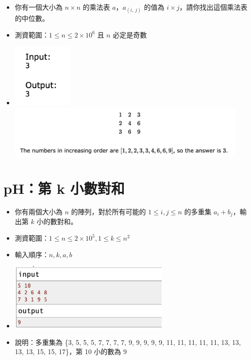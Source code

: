 \documentclass[12pt]{article}
\begin{document}
\begin{itemize}[label={}, itemsep=0pt]
    \item 你有一個大小為 $n \times n$ 的乘法表 $a$，$a_{(i,\ j)}$ 的值為 $i \times j$，請你找出這個乘法表的中位數。
    \item 測資範圍：$1 \leq n \leq 2 \times 10^6$ 且 $n$ 必定是奇數
    \item \includegraphics[width=3.0cm]{img/pG-2.png}\includegraphics[width=12.0cm]{img/pG-1.png}
\end{itemize}

\section*{pH：第 k 小數對和}

\begin{itemize}[label={}, itemsep=0pt]
    \item 你有兩個大小為 $n$ 的陣列，對於所有可能的 $1 \leq i, j \leq n$ 的多重集 $a_i+b_j$，輸出第 $k$ 小的數對和。
    \item 測資範圍：$1 \leq n \leq 2 \times 10^5, 1 \leq k \leq n^2$
    \item 輸入順序：$n, k, a, b$
    \item \includegraphics[width=8.0cm]{img/pH.png}
    \item 說明：多重集為 \{3, 5, 5, 5, 7, 7, 7, 7, 9, 9, 9, 9, 9, 11, 11, 11, 11, 11, 13, 13, 13, 13, 15, 15, 17\}，第 10 小的數為 9
\end{itemize}
\end{document}
